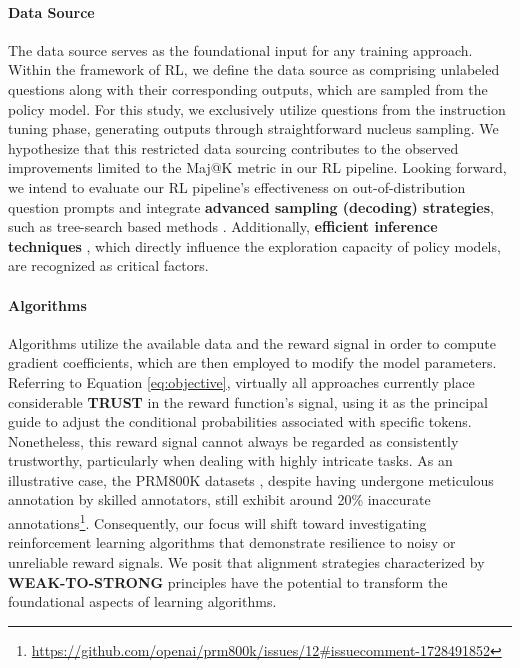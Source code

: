 \begin{itemize}[topsep=0pt]
\begin{itemize}[topsep=0pt]
\paragraph{Data Source} The data source serves as the foundational input for any training approach. Within the framework of RL, we define the data source as comprising unlabeled questions along with their corresponding outputs, which are sampled from the policy model. For this study, we exclusively utilize questions from the instruction tuning phase, generating outputs through straightforward nucleus sampling. We hypothesize that this restricted data sourcing contributes to the observed improvements limited to the Maj@K metric in our RL pipeline. Looking forward, we intend to evaluate our RL pipeline's effectiveness on out-of-distribution question prompts and integrate \textbf{advanced sampling (decoding) strategies}, such as tree-search based methods \citep{yao2023tree}. Additionally, \textbf{efficient inference techniques} \citep{xia-etal-2023-speculative,leviathan2023fast,kwon2023efficient,xia2024unlocking}, which directly influence the exploration capacity of policy models, are recognized as critical factors.

\paragraph{Algorithms} Algorithms utilize the available data and the reward signal in order to compute gradient coefficients, which are then employed to modify the model parameters. Referring to Equation \ref{eq:objective}, virtually all approaches currently place considerable \textbf{TRUST} in the reward function’s signal, using it as the principal guide to adjust the conditional probabilities associated with specific tokens. Nonetheless, this reward signal cannot always be regarded as consistently trustworthy, particularly when dealing with highly intricate tasks. As an illustrative case, the PRM800K datasets \citep{lightman2023let}, despite having undergone meticulous annotation by skilled annotators, still exhibit around 20\% inaccurate annotations\footnote{\url{https://github.com/openai/prm800k/issues/12\#issuecomment-1728491852}}. Consequently, our focus will shift toward investigating reinforcement learning algorithms that demonstrate resilience to noisy or unreliable reward signals. We posit that alignment strategies characterized by \textbf{WEAK-TO-STRONG} principles \citep{burns2023weak} have the potential to transform the foundational aspects of learning algorithms.


\end{itemize}
\end{itemize}
